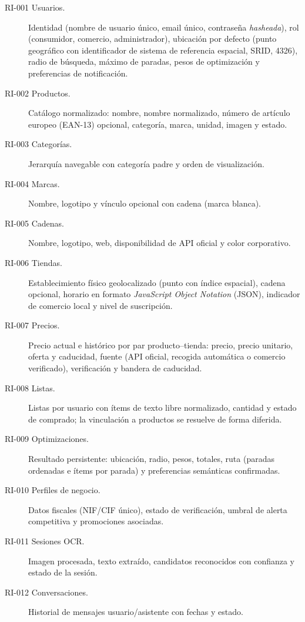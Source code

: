 \begin{description}
  \item[RI-001 Usuarios.] Identidad (nombre de usuario \'unico, email \'unico, contrase\~na
    \emph{hasheada}), rol (consumidor, comercio, administrador), ubicaci\'on por defecto (punto
    geogr\'afico con identificador de sistema de referencia espacial, SRID, 4326), radio de
    b\'usqueda, m\'aximo de paradas, pesos de optimizaci\'on y preferencias de notificaci\'on.
  \item[RI-002 Productos.] Cat\'alogo normalizado: nombre, nombre normalizado, n\'umero de
    art\'iculo europeo (EAN-13) opcional, categor\'ia, marca, unidad, imagen y estado.
  \item[RI-003 Categor\'ias.] Jerarqu\'ia navegable con categor\'ia padre y orden de
    visualizaci\'on.
  \item[RI-004 Marcas.] Nombre, logotipo y v\'inculo opcional con cadena (marca blanca).
  \item[RI-005 Cadenas.] Nombre, logotipo, web, disponibilidad de API oficial y color corporativo.
  \item[RI-006 Tiendas.] Establecimiento f\'isico geolocalizado (punto con \'indice espacial),
    cadena opcional, horario en formato \emph{JavaScript Object Notation} (JSON), indicador de
    comercio local y nivel de suscripci\'on.
  \item[RI-007 Precios.] Precio actual e hist\'orico por par producto--tienda: precio, precio
    unitario, oferta y caducidad, fuente (API oficial, recogida autom\'atica o comercio
    verificado), verificaci\'on y bandera de caducidad.
  \item[RI-008 Listas.] Listas por usuario con \'items de texto libre normalizado, cantidad y
    estado de comprado; la vinculaci\'on a productos se resuelve de forma diferida.
  \item[RI-009 Optimizaciones.] Resultado persistente: ubicaci\'on, radio, pesos, totales, ruta
    (paradas ordenadas e \'items por parada) y preferencias sem\'anticas confirmadas.
  \item[RI-010 Perfiles de negocio.] Datos fiscales (NIF/CIF \'unico), estado de verificaci\'on,
    umbral de alerta competitiva y promociones asociadas.
  \item[RI-011 Sesiones OCR.] Imagen procesada, texto extra\'ido, candidatos reconocidos con
    confianza y estado de la sesi\'on.
  \item[RI-012 Conversaciones.] Historial de mensajes usuario/asistente con fechas y estado.
\end{description}

